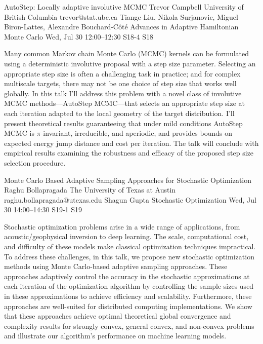 \begin{talk}
  {AutoStep: Locally adaptive involutive MCMC}%
  {Trevor Campbell}%
  {University of British Columbia}%
  {trevor@stat.ubc.ca}%
  {Tiange Liu, Nikola Surjanovic, Miguel Biron-Lattes, Alexandre Bouchard-C\^ot\'e}%
  {Advances in Adaptive Hamiltonian Monte Carlo}%
  {Wed, Jul 30 12:00–12:30}%
  {S18-4}%
  {S18}%
				

\medskip

Many common Markov chain Monte Carlo (MCMC) kernels can be formulated using a deterministic involutive proposal with a step size parameter.  Selecting an appropriate step size is often a challenging task in practice; and for complex multiscale targets, there may not be one choice of step size that works well globally.  In this talk I'll address this problem with a novel class of involutive MCMC methods---AutoStep MCMC---that selects an appropriate step size at each iteration adapted to the local geometry of the target distribution.  I'll present theoretical results guaranteeing that under mild conditions AutoStep MCMC is $\pi$-invariant, irreducible, and aperiodic, and provides bounds on expected energy jump distance and cost per iteration. The talk will conclude with empirical results examining the robustness and efficacy of the proposed step size selection procedure.

\end{talk}

\begin{talk}
  {Monte Carlo Based Adaptive Sampling Approaches for Stochastic Optimization}%
  {Raghu Bollapragada}%
  {The University of Texas at Austin}%
  {raghu.bollapragada@utexas.edu}%
  {Shagun Gupta}%
  {Stochastic Optimization}%
  {Wed, Jul 30 14:00–14:30}%
  {S19-1}%
  {S19}%
				
			
Stochastic optimization problems arise in a wide range of applications, from acoustic/geophysical inversion to deep learning. The scale, computational cost, and difficulty of these models make classical optimization techniques impractical. To address these challenges, in this talk, we propose new stochastic optimization methods using Monte Carlo-based adaptive sampling approaches. These approaches adaptively control the accuracy in the stochastic approximations at each iteration of the optimization algorithm by controlling the sample sizes used in these approximations to achieve efficiency and scalability. Furthermore, these approaches are well-suited for distributed computing implementations. We show that these approaches achieve optimal theoretical global convergence and complexity results for strongly convex, general convex, and non-convex problems and illustrate our algorithm's performance on machine learning models.

\medskip

\end{talk}

